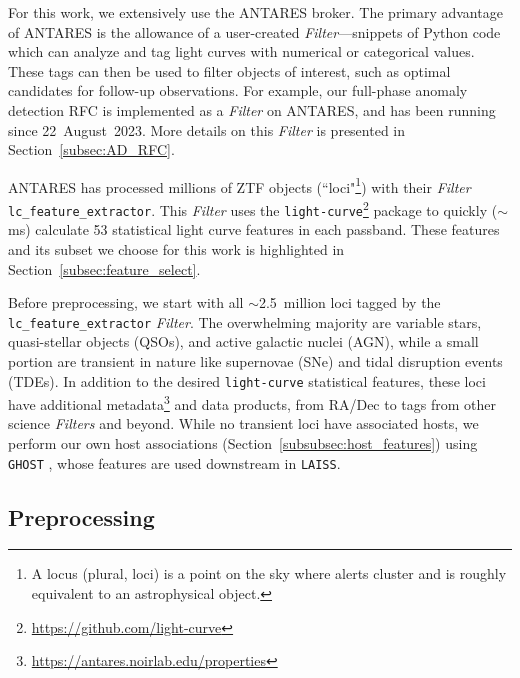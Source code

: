 \documentclass[twocolumn]{aastex63}
\newcommand{\laiss}{\texttt{LAISS}}
\begin{document}
For this work, we extensively use the ANTARES broker. 
The primary advantage of ANTARES is the allowance of a user-created \emph{Filter}---snippets of Python code which can analyze and tag light curves with numerical or categorical values. These tags can then be used to filter objects of interest, such as optimal candidates for follow-up observations. For example, our full-phase anomaly detection RFC is implemented as a \emph{Filter} on ANTARES, and has been running since 22~August~2023. More details on this \emph{Filter} is presented in Section~\ref{subsec:AD_RFC}. \par

ANTARES has processed millions of ZTF objects (``loci"\footnote{A locus (plural, loci) is a point on the sky where alerts cluster and is roughly equivalent to an astrophysical object.}) with their \emph{Filter} \texttt{lc\_feature\_extractor}. This \emph{Filter} uses the \texttt{light-curve}\footnote{\url{https://github.com/light-curve}} package \citep{Malanchev-LC} to quickly ($\sim$ms) calculate 53 statistical light curve features in each passband. These features and its subset we choose for this work is highlighted in Section~\ref{subsec:feature_select}. 

Before preprocessing, we start with all $\sim$2.5~million loci tagged by the \texttt{lc\_feature\_extractor} \emph{Filter}. The overwhelming majority are variable stars, quasi-stellar objects (QSOs), and active galactic nuclei (AGN), while a small portion are transient in nature like supernovae (SNe) and tidal disruption events (TDEs). In addition to the desired \texttt{light-curve} statistical features, these loci have additional metadata\footnote{\url{https://antares.noirlab.edu/properties}} and data products, from RA/Dec to tags from other science \emph{Filters} and beyond. While no transient loci have associated hosts, we perform our own host associations  (Section~\ref{subsubsec:host_features}) using \texttt{GHOST} \citep{Gagliano2021}, whose features are used downstream in \laiss{}.

\subsection{Preprocessing} \label{subsec:preprocess}
\end{document}
